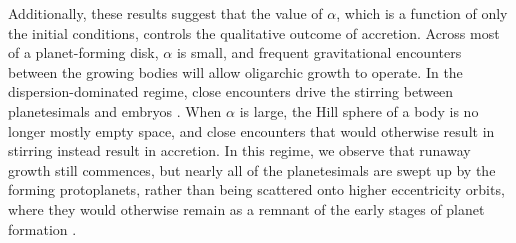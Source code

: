 \documentclass[twocolumn]{aastex63}
\begin{document}
Additionally, these results suggest that the value of $\alpha$, which is a function of only the initial conditions, controls the qualitative outcome of accretion. Across most of a planet-forming disk, $\alpha$ is small, and frequent gravitational encounters between the growing bodies will allow oligarchic growth to operate. In the dispersion-dominated regime, close encounters drive the stirring between planetesimals and embryos \citep{weidenschilling89, ida90}. When $\alpha$ is large, the Hill sphere of a body is no longer mostly empty space, and close encounters that would otherwise result in stirring instead result in accretion. In this regime, we observe that runaway growth still commences, but nearly all of the planetesimals are swept up by the forming protoplanets, rather than being scattered onto higher eccentricity orbits, where they would otherwise remain as a remnant of the early stages of planet formation \citep{kokubo98, kokubo00}.




\end{document}
